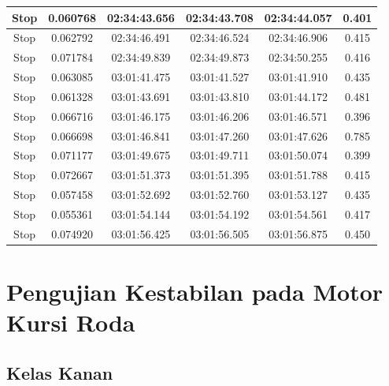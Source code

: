\begin{longtable}{|c|c|c|c|c|c|}
      Stop & 0.060768 & 02:34:43.656 & 02:34:43.708 & 02:34:44.057 & 0.401 \\ \hline
      Stop & 0.062792 & 02:34:46.491 & 02:34:46.524 & 02:34:46.906 & 0.415 \\ \hline
      Stop & 0.071784 & 02:34:49.839 & 02:34:49.873 & 02:34:50.255 & 0.416 \\ \hline
      Stop & 0.063085 & 03:01:41.475 & 03:01:41.527 & 03:01:41.910 & 0.435 \\ \hline
      Stop & 0.061328 & 03:01:43.691 & 03:01:43.810 & 03:01:44.172 & 0.481 \\ \hline
      Stop & 0.066716 & 03:01:46.175 & 03:01:46.206 & 03:01:46.571 & 0.396 \\ \hline
      Stop & 0.066698 & 03:01:46.841 & 03:01:47.260 & 03:01:47.626 & 0.785 \\ \hline
      Stop & 0.071177 & 03:01:49.675 & 03:01:49.711 & 03:01:50.074 & 0.399 \\ \hline
      Stop & 0.072667 & 03:01:51.373 & 03:01:51.395 & 03:01:51.788 & 0.415 \\ \hline
      Stop & 0.057458 & 03:01:52.692 & 03:01:52.760 & 03:01:53.127 & 0.435 \\ \hline
      Stop & 0.055361 & 03:01:54.144 & 03:01:54.192 & 03:01:54.561 & 0.417 \\ \hline
      Stop & 0.074920 & 03:01:56.425 & 03:01:56.505 & 03:01:56.875 & 0.450 \\ \hline
\end{longtable}

\section{Pengujian Kestabilan pada Motor Kursi Roda}

\subsection{Kelas Kanan}

